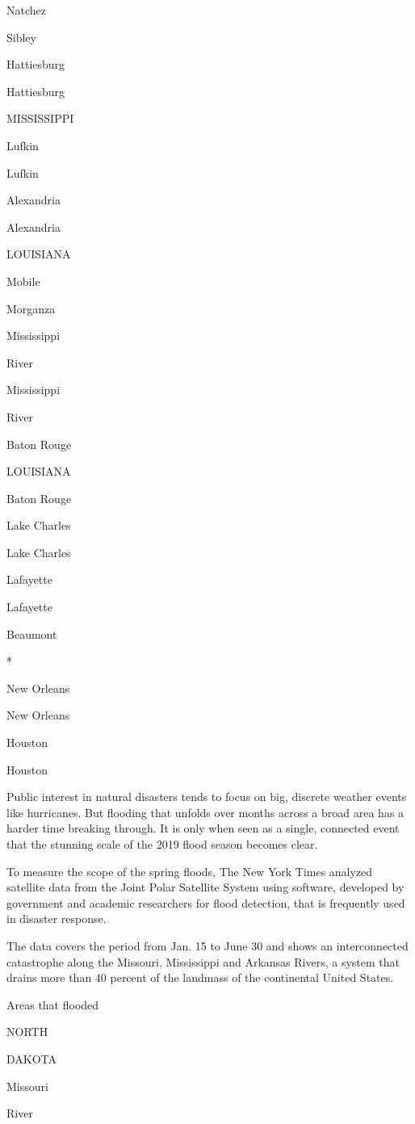 Natchez

Sibley

Hattiesburg

Hattiesburg

MISSISSIPPI

Lufkin

Lufkin

Alexandria

Alexandria

LOUISIANA

Mobile

Morganza

Mississippi

River

Mississippi

River

Baton Rouge

LOUISIANA

Baton Rouge

Lake Charles

Lake Charles

Lafayette

Lafayette

Beaumont

*

New Orleans

New Orleans

Houston

Houston

Public interest in natural disasters tends to focus on big, discrete
weather events like hurricanes. But flooding that unfolds over months
across a broad area has a harder time breaking through. It is only when
seen as a single, connected event that the stunning scale of the 2019
flood season becomes clear.

To measure the scope of the spring floods, The New York Times analyzed
satellite data from the Joint Polar Satellite System using software,
developed by government and academic researchers for flood detection,
that is frequently used in disaster response.

The data covers the period from Jan. 15 to June 30 and shows an
interconnected catastrophe along the Missouri, Mississippi and Arkansas
Rivers, a system that drains more than 40 percent of the landmass of the
continental United States.

Areas that flooded

NORTH

DAKOTA

Missouri

River


